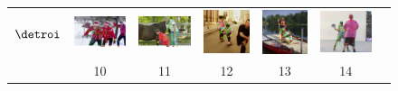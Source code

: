 \begin{figure}
\begin{tabular}{c c c c c c c}
    \midrule\midrule
    \begin{sideways}\bf \quad\quad$\detroi$\end{sideways}&
    \includegraphics[height=0.140\linewidth]{imgidx_0075_sticks_detroi_mpii_multi.pdf}&
    \includegraphics[height=0.140\linewidth]{imgidx_1017_sticks_detroi_mpii_multi.pdf}& 
    \includegraphics[height=0.140\linewidth]{imgidx_1033_sticks_detroi_mpii_multi.pdf}&
    \includegraphics[height=0.140\linewidth]{imgidx_0210_sticks_detroi_mpii_multi.pdf}&
    \includegraphics[height=0.140\linewidth]{imgidx_0697_sticks_detroi_mpii_multi.pdf}\\
    &10&11&12&13&14\\  
  \end{tabular}


\end{figure}
